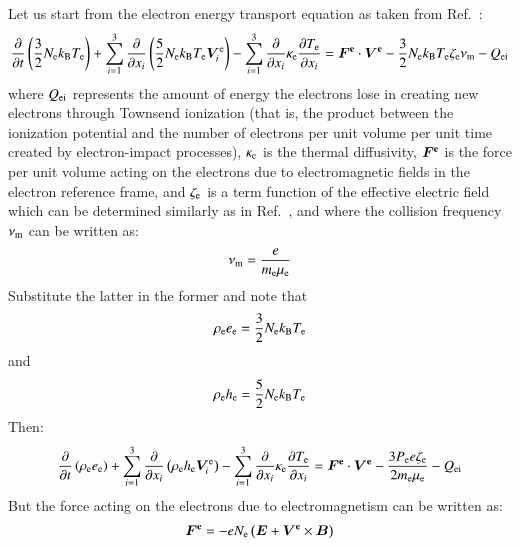 \documentclass{warpdoc}
\renewcommand{\vec}[1]{\bm{#1}}
\begin{document}
Let us start from the electron energy transport equation as taken from Ref.\ \cite[page 34]{book:1991:raizer}:
%
\begin{equation}
  \frac{\partial }{\partial t} \left( \frac{3}{2} N_{\rm e} k_{\rm B} T_{\rm e} \right)
  + \sum_{i=1}^3 \frac{\partial }{\partial x_i} \left(\frac{5}{2}  N_{\rm e} k_{\rm B} T_{\rm e} \vec{V}_i^{\rm e} \right)
  - \sum_{i=1}^3 \frac{\partial }{\partial x_i} \kappa_{\rm e} \frac{\partial T_{\rm e}}{\partial x_i}
  =
   \vec{F^{\rm e}}\cdot \vec{V^{\rm e}}
 - \frac{3}{2} N_{\rm e} k_{\rm B} T_{\rm e} \zeta_{\rm e} \nu_{\rm m} - Q_{\rm ei}  
 \end{equation}
%
where $Q_{\rm ei}$ represents the amount of energy the electrons lose in creating new electrons through Townsend
ionization (that is, the product between the ionization potential and the number of electrons per unit volume per unit time created by electron-impact processes), $\kappa_{\rm e}$ is the thermal diffusivity,  $\vec{F^{\rm e}}$ is the force per unit volume acting on the electrons due to electromagnetic fields in the electron reference frame, and $\zeta_{\rm e}$ is a term function of the effective electric field which can be determined similarly as in Ref.\ \cite{misc:1995:boeuf}, and where the collision frequency $\nu_{\rm m}$ can be written as:
%
\begin{equation}
\nu_{\rm m}=\frac{e}{m_{\rm e}\mu_{\rm e}}
\end{equation}
%
Substitute the latter in the former and note that 
%
\begin{equation}
\rho_{\rm e} e_{\rm e} = \frac{3}{2} N_{\rm e} k_{\rm B} T_{\rm e}
\end{equation}
%
and
%
\begin{equation}
\rho_{\rm e}  h_{\rm e} = \frac{5}{2} N_{\rm e} k_{\rm B} T_{\rm e}
\end{equation}
%
Then:
%
\begin{equation}
  \frac{\partial }{\partial t} \left( \rho_{\rm e} e_{\rm e} \right)
  + \sum_{i=1}^3 \frac{\partial }{\partial x_i} \left(\rho_{\rm e} h_{\rm e} \vec{V}_i^{\rm e} \right)
  - \sum_{i=1}^3 \frac{\partial }{\partial x_i} \kappa_{\rm e} \frac{\partial T_{\rm e}}{\partial x_i}
  =
   \vec{F^{\rm e}}\cdot \vec{V^{\rm e}}
 -    \frac{3 P_{\rm e}  e \zeta_{\rm e}}{2 m_{\rm e}\mu_{\rm e}} - Q_{\rm ei}  
 \end{equation}
%
But the force acting on the electrons due to electromagnetism can be written as:
%
\begin{equation}
  \vec{F^{\rm e}} = -eN_{\rm e}\left(\vec{E} + \vec{V^{\rm e}} \times \vec{B}\right)
\end{equation}
\end{document}
